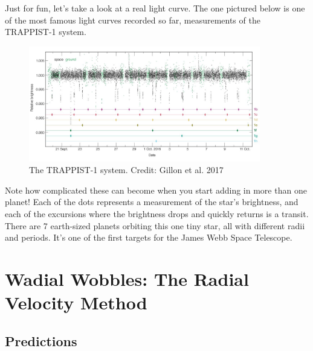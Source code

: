 \documentclass[11pt]{article}
\begin{document}
\noindent
Just for fun, let's take a look at a real light curve. The one pictured below is one of the most famous light curves recorded so far, measurements of the TRAPPIST-1 system. 

\begin{figure}[h!]
    \centering
    \includegraphics[width=0.9\textwidth]{Images/trappist1.png}
    \caption{The TRAPPIST-1 system. Credit: Gillon et al. 2017}
    \label{fig:transits}
\end{figure}

\medskip \noindent
Note how complicated these can become when you start adding in more than one planet! Each of the dots represents a measurement of the star's brightness, and each of the excursions where the brightness drops and quickly returns is a transit. There are 7 earth-sized planets orbiting this one tiny star, all with different radii and periods. It's one of the first targets for the James Webb Space Telescope.

\pagebreak
\section{Wadial Wobbles: The Radial Velocity Method}
\subsection{Predictions} \label{sec:RV_predictions}
\end{document}
